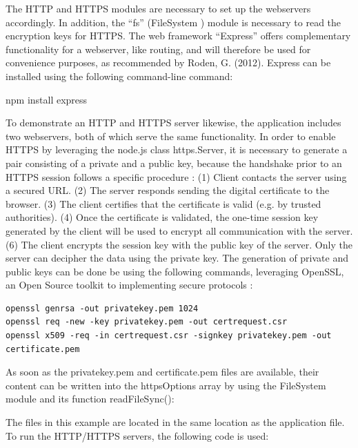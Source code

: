 


The HTTP and HTTPS modules are necessary to set up the webservers accordingly. 
In addition, the “fs” (FileSystem ) module is necessary to read the encryption keys for HTTPS.
 The web framework “Express” offers complementary functionality for a webserver, like routing, 
and will therefore be used for convenience purposes, as recommended by Roden, G. (2012). 
Express can be installed using the following command-line command:

npm install express 

To demonstrate an HTTP and HTTPS server likewise, the application includes two webservers, 
both of which serve the same functionality. In order to enable HTTPS by leveraging 
the node.js class https.Server, it is necessary to generate a pair consisting of a private 
and a public key, because the handshake prior to an HTTPS session follows a specific procedure :
 (1) Client contacts the server using a secured URL.
 (2) The server responds sending the digital certificate to the browser.
 (3) The client certifies that the certificate is valid (e.g. by trusted authorities).
 (4) Once the certificate is validated, the one-time session key generated by the client will be used to encrypt all communication with the server.
 (6) The client encrypts the session key with the public key of the server. Only the server can decipher the data using the private key.
The generation of private and public keys can be done be using the following commands, leveraging OpenSSL, an Open Source toolkit to implementing secure protocols :

\begin{lstlisting}[caption={Generating a new pair of public/private keys}]
openssl genrsa -out privatekey.pem 1024
openssl req -new -key privatekey.pem -out certrequest.csr 
openssl x509 -req -in certrequest.csr -signkey privatekey.pem -out certificate.pem
\end{lstlisting}
As soon as the privatekey.pem and certificate.pem files are available, their content can be written into the httpsOptions array by using the FileSystem module and its function readFileSync():




The files in this example are located in the same location as the application file. To run the HTTP/HTTPS servers, the following code is used:

